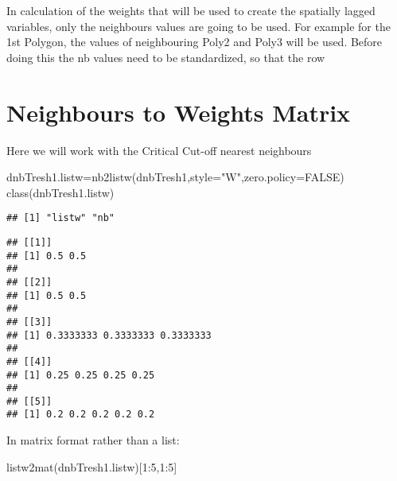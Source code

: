 \documentclass[
]{book}
\newenvironment{Shaded}{\begin{snugshade}}{\end{snugshade}}
\newcommand{\AttributeTok}[1]{\textcolor[rgb]{0.77,0.63,0.00}{#1}}
\newcommand{\ConstantTok}[1]{\textcolor[rgb]{0.00,0.00,0.00}{#1}}
\newcommand{\DecValTok}[1]{\textcolor[rgb]{0.00,0.00,0.81}{#1}}
\newcommand{\FunctionTok}[1]{\textcolor[rgb]{0.00,0.00,0.00}{#1}}
\newcommand{\NormalTok}[1]{#1}
\newcommand{\OtherTok}[1]{\textcolor[rgb]{0.56,0.35,0.01}{#1}}
\newcommand{\SpecialCharTok}[1]{\textcolor[rgb]{0.00,0.00,0.00}{#1}}
\newcommand{\StringTok}[1]{\textcolor[rgb]{0.31,0.60,0.02}{#1}}
\begin{document}
In calculation of the weights that will be used to create the spatially lagged variables, only the neighbours values are going to be used. For example for the 1st Polygon, the values of neighbouring Poly2 and Poly3 will be used. Before doing this the nb values need to be standardized, so that the row

\hypertarget{neighbours-to-weights-matrix}{%
\section{Neighbours to Weights Matrix}\label{neighbours-to-weights-matrix}}

Here we will work with the Critical Cut-off nearest neighbours

\begin{Shaded}
\begin{Highlighting}[]
\NormalTok{dnbTresh1.listw}\OtherTok{=}\FunctionTok{nb2listw}\NormalTok{(dnbTresh1,}\AttributeTok{style=}\StringTok{"W"}\NormalTok{,}\AttributeTok{zero.policy=}\ConstantTok{FALSE}\NormalTok{)}
\FunctionTok{class}\NormalTok{(dnbTresh1.listw)}
\end{Highlighting}
\end{Shaded}

\begin{verbatim}
## [1] "listw" "nb"
\end{verbatim}

\begin{Shaded}
\end{Shaded}

\begin{verbatim}
## [[1]]
## [1] 0.5 0.5
## 
## [[2]]
## [1] 0.5 0.5
## 
## [[3]]
## [1] 0.3333333 0.3333333 0.3333333
## 
## [[4]]
## [1] 0.25 0.25 0.25 0.25
## 
## [[5]]
## [1] 0.2 0.2 0.2 0.2 0.2
\end{verbatim}

In matrix format rather than a list:

\begin{Shaded}
\begin{Highlighting}[]
\FunctionTok{listw2mat}\NormalTok{(dnbTresh1.listw)[}\DecValTok{1}\SpecialCharTok{:}\DecValTok{5}\NormalTok{,}\DecValTok{1}\SpecialCharTok{:}\DecValTok{5}\NormalTok{]}
\end{Highlighting}
\end{Shaded}
\end{document}
